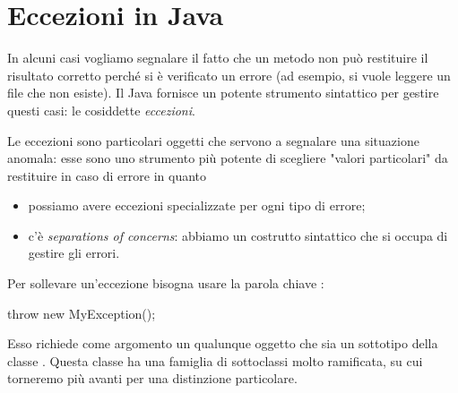 \section{Eccezioni in Java}

In alcuni casi vogliamo segnalare il fatto che un metodo non può restituire il risultato corretto perché si è verificato un errore (ad esempio, si vuole leggere un file che non esiste). Il Java fornisce un potente strumento sintattico per gestire questi casi: le cosiddette \emph{eccezioni}.

Le eccezioni sono particolari oggetti che servono a segnalare una situazione anomala: esse sono uno strumento più potente di scegliere "valori particolari" da restituire in caso di errore in quanto
\begin{itemize}
    \item possiamo avere eccezioni specializzate per ogni tipo di errore;
    \item c'è \emph{separations of concerns}: abbiamo un costrutto sintattico che si occupa di gestire gli errori.
\end{itemize}

Per sollevare un'eccezione bisogna usare la parola chiave :
\begin{Java}
    throw new MyException();
\end{Java}
Esso richiede come argomento un qualunque oggetto che sia un sottotipo della classe . Questa classe ha una famiglia di sottoclassi molto ramificata, su cui torneremo più avanti per una distinzione particolare.

